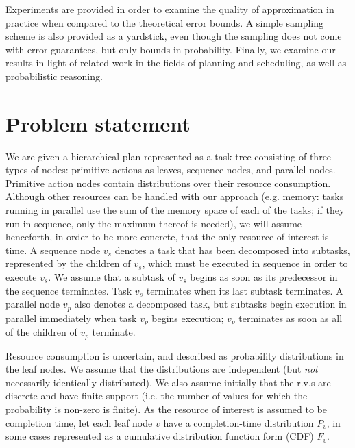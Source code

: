 \documentclass{article}
\begin{document}
Experiments are provided in order to examine the quality of approximation in practice when compared to the theoretical
error bounds. A simple sampling scheme is also provided as a yardstick, even though the sampling does not come with
error guarantees, but only bounds in probability. 
Finally, we examine our results in light of related work in the fields of planning and scheduling, as well as
probabilistic reasoning. %


\section{Problem statement}\label{sec:formal}

We are given a hierarchical plan represented as a task tree consisting of three types of nodes: primitive actions as leaves, sequence nodes, and parallel nodes.
Primitive action nodes contain distributions over their resource consumption. 
Although other resources can be handled with our approach (e.g. memory: tasks running in parallel use the sum of the memory space of each of the tasks; if they run in sequence, only the maximum thereof is needed), we will assume henceforth, in order to be more concrete, that the only resource of interest is time.
A sequence node $v_s$ denotes a task that has been decomposed
into subtasks, represented by the children of $v_s$, which must be executed in sequence 
in order to execute $v_s$.
We assume that a subtask of $v_s$ begins as soon as its predecessor in the sequence terminates.
Task $v_s$ terminates when its last subtask terminates.
A parallel node $v_p$ also denotes a decomposed task, but subtasks begin execution in parallel
immediately when task $v_p$ begins execution;  $v_p$ terminates
as soon as all of the children of $v_p$ terminate.

Resource consumption is uncertain, and described as probability distributions in the leaf nodes.
We assume  that the distributions are  independent (but {\em not} necessarily identically distributed).
We also assume initially that the r.v.s are discrete and have finite support (i.e. the number of values
for which the probability is non-zero is finite).
As the resource of interest is assumed to be completion time, let each leaf node $v$ have
a completion-time distribution $P_v$, in some cases represented as a cumulative 
distribution function form (CDF) $F_v$.
\end{document}
